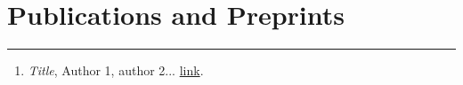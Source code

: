 \documentclass[letterpaper]{article}
\begin{document}
\section*{Publications and Preprints}
\vspace{-8pt}
\hrule height .7pt
\smallskip
\begin{enumerate}
\item {\em Title},
Author 1, author 2...
\href{http://arxiv.org/abs/1501.04227}{link}.

\end{enumerate}
\end{document}
